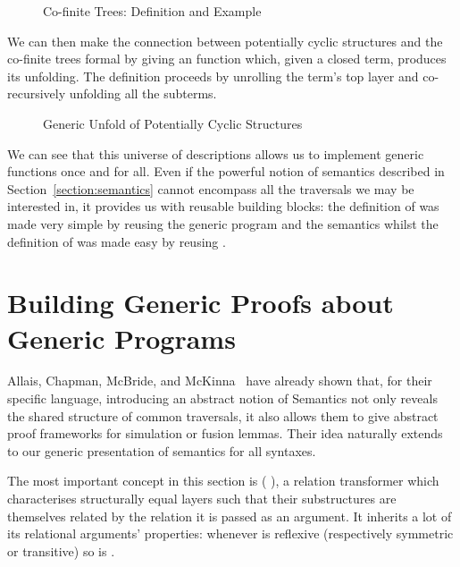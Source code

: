 \begin{figure}[h]
\begin{minipage}{0.55\textwidth}
\end{minipage}\hspace{2em}
\begin{minipage}{0.35\textwidth}
\end{minipage}
\caption{Co-finite Trees: Definition and Example}
\end{figure}

We can then make the connection between potentially cyclic
structures and the co-finite trees formal by giving an 
function which, given a closed term, produces its unfolding.
The definition proceeds by unrolling the term's top layer and
co-recursively unfolding all the subterms.

\begin{figure}[h]
\caption{Generic Unfold of Potentially Cyclic Structures}
\end{figure}

We can see that this universe of descriptions allows us to
implement generic functions once and for all. Even if the
powerful notion of semantics described in Section~\ref{section:semantics}
cannot encompass all the traversals we may be interested in,
it provides us with reusable building blocks: the definition
of  was made very simple by reusing the generic
program  and the  semantics whilst
the definition of  was made easy by reusing .



\section{Building Generic Proofs about Generic Programs}\label{section:simulation}

Allais, Chapman, McBride, and McKinna~\citeyear{allais2017type} have
already shown that, for their specific language, introducing an abstract
notion of Semantics not only reveals the shared structure of common
traversals, it also allows them to give abstract proof frameworks for
simulation or fusion lemmas. Their idea naturally extends to our generic
presentation of semantics for all syntaxes.

The most important concept in this section is ( ), a relation
transformer which characterises structurally equal layers such that their
substructures are themselves related by the relation it is passed as an
argument. It inherits a lot of its relational arguments' properties: whenever
 is reflexive (respectively symmetric or transitive) so is {  }.

